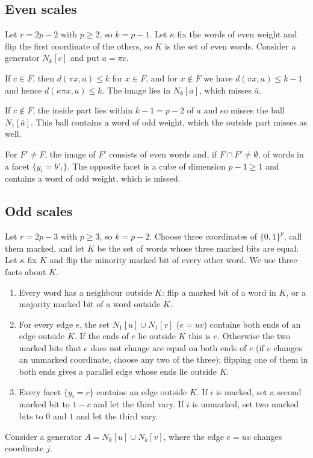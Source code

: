 \documentclass[11pt]{amsart}
\theoremstyle{remark}
\newcommand{\cl}[2]{N_{#1}[#2]}
\begin{document}
\subsection*{Even scales}
Let $r=2p-2$ with $p\ge2$, so $k=p-1$. Let $\kappa$ fix the words of even weight and flip the first coordinate of the
others, so $K$ is the set of even words. Consider a generator $\cl kc$ and put $a=\pi c$.

If $c\in F$, then $d(\pi x,a)\le k$ for $x\in F$, and for $x\notin F$ we have $d(\pi x,a)\le k-1$ and hence
$d(\kappa\pi x,a)\le k$. The image lies in $\cl ka$, which misses $\bar a$.

If $c\notin F$, the inside part lies within $k-1=p-2$ of $a$ and so misses the ball $\cl1{\bar a}$. This ball contains a
word of odd weight, which the outside part misses as well.

For $F'\ne F$, the image of $F'$ consists of even words and, if $F\cap F'\ne\emptyset$, of words in a facet
$\{y_i=b'_i\}$. The opposite facet is a cube of dimension $p-1\ge1$ and contains a word of odd weight, which is missed.

\subsection*{Odd scales}
Let $r=2p-3$ with $p\ge3$, so $k=p-2$. Choose three coordinates of $\{0,1\}^p$, call them marked, and let $K$ be the set of
words whose three marked bits are equal. Let $\kappa$ fix $K$ and flip the minority marked bit of every other word. We use
three facts about $K$.
\begin{enumerate}
\item Every word has a neighbour outside $K$: flip a marked bit of a word in $K$, or a majority marked bit of a word
outside $K$.
\item For every edge $e$, the set $\cl1u\cup\cl1v$ ($e=uv$) contains both ends of an edge outside $K$. If the ends of $e$
lie outside $K$ this is $e$. Otherwise the two marked bits that $e$ does not change are equal on both ends of $e$
(if $e$ changes an unmarked coordinate, choose any two of the three); flipping one of them in both ends gives a parallel
edge whose ends lie outside $K$.
\item Every facet $\{y_i=c\}$ contains an edge outside $K$. If $i$ is marked, set a second marked bit to $1-c$ and let
the third vary. If $i$ is unmarked, set two marked bits to $0$ and $1$ and let the third vary.
\end{enumerate}
Consider a generator $A=\cl ku\cup\cl kv$, where the edge $e=uv$ changes coordinate $j$.
\end{document}
